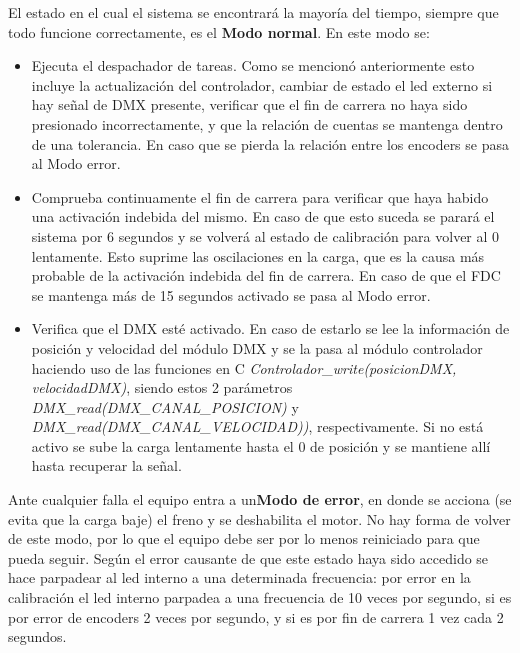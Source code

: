 El estado en el cual el sistema se encontrará la mayoría del tiempo, siempre que todo funcione correctamente, es el \textbf{Modo normal}. En este modo se:
\begin{itemize}
	\item Ejecuta el despachador de tareas. Como se mencionó anteriormente esto incluye la actualización del controlador, cambiar de estado el led externo si hay señal de DMX presente, verificar que el fin de carrera no haya sido presionado incorrectamente, y que la relación de cuentas se mantenga dentro de una tolerancia. En caso que se pierda la relación entre los encoders se pasa al Modo error.
	\item Comprueba continuamente el fin de carrera para verificar que haya habido una activación indebida del mismo. En caso de que esto suceda se parará el sistema por 6 segundos y se volverá al estado de calibración para volver al 0 lentamente. Esto suprime las oscilaciones en la carga, que es la causa más probable de la activación indebida del fin de carrera. En caso de que el FDC se mantenga más de 15 segundos activado se pasa al Modo error.
	\item Verifica que el DMX esté activado. En caso de estarlo se lee la información de posición y velocidad del módulo DMX y se la pasa al módulo controlador haciendo uso de las funciones en C \textit{ Controlador\_write(posicionDMX, velocidadDMX)}, siendo estos 2 parámetros \textit{DMX\_read(DMX\_CANAL\_POSICION)} y \\ \textit{DMX\_read(DMX\_CANAL\_VELOCIDAD))}, respectivamente. Si no está activo se sube la carga lentamente hasta el 0 de posición y se mantiene allí hasta recuperar la señal.
\end{itemize}

Ante cualquier falla el equipo entra a un\textbf{Modo de error}, en donde se acciona (se evita que la carga baje) el freno y se deshabilita el motor. No hay forma de volver de este modo, por lo que el equipo debe ser por lo menos reiniciado para que pueda seguir. Según el error causante de que este estado haya sido accedido se hace parpadear al led interno a una determinada frecuencia: por error en la calibración el led interno parpadea a una frecuencia de 10 veces por segundo, si es por error de encoders 2 veces por segundo, y si es por fin de carrera 1 vez cada 2 segundos.






